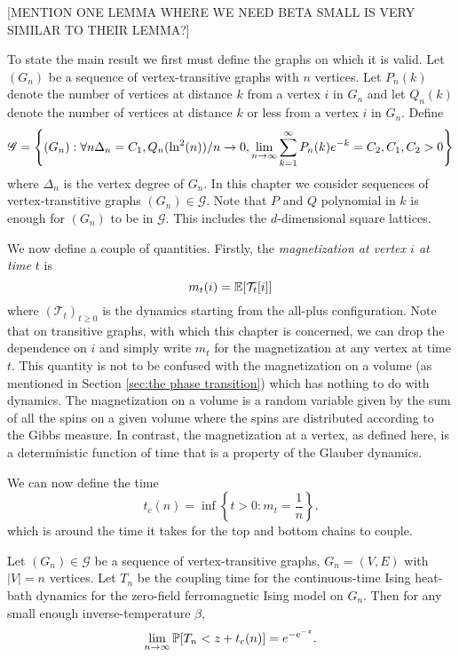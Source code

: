 [MENTION ONE LEMMA WHERE WE NEED BETA SMALL IS VERY SIMILAR TO THEIR LEMMA?]

To state the main result we first must define the graphs on which it is valid. Let $(G_{n})$ be a sequence of vertex-transitive graphs with $n$ vertices. Let $P_n(k)$ denote the number of vertices at distance $k$ from a vertex $i$ in $G_n$ and let $Q_n(k)$ denote the number of vertices at distance $k$ or less from a vertex $i$ in $G_n$. Define
\begin{equation}
	\mathscr{G} = \left\{(G_n) : \forall n \Delta_n = C_1, Q_n(\ln^2(n))/n \rightarrow 0, \lim_{n \rightarrow \infty}\sum_{k = 1}^\infty P_n(k)e^{-k} = C_2, C_1, C_2 > 0\right\}
	\label{eq:set valid graphs}
\end{equation}
where $\Delta_n$ is the vertex degree of $G_n$.
In this chapter we consider sequences of vertex-transtitive graphs $(G_n) \in \mathscr{G}$. Note that $P$ and $Q$ polynomial in $k$ is enough for $(G_n)$ to be in $\mathscr{G}$. This includes the $d$-dimensional square lattices.

We now define a couple of quantities. Firstly, the \emph{magnetization at vertex $i$ at time $t$} is
\begin{equation}
	 	m_t(i) = \mathbb{E}[\mathcal{T}_t[i]]
\end{equation} 
where $(\mathcal{T}_t)_{t \geq 0}$ is the dynamics starting from the all-plus configuration. Note that on transitive graphs, with which this chapter is concerned, we can drop the dependence on $i$ and simply write $m_t$ for the magnetization at any vertex at time $t$. This quantity is not to be confused with the magnetization on a volume (as mentioned in Section \ref{sec:the phase transition}) which has nothing to do with dynamics. The magnetization on a volume is a random variable given by the sum of all the spins on a given volume where the spins are distributed according to the Gibbs measure. In contrast, the magnetization at a vertex, as defined here, is a deterministic function of time that is a property of the Glauber dynamics.

We can now define the time
\begin{equation}
	\label{eq:definition t_c(n)}
	t_c(n) = \inf\left\{ t > 0 : m_t = \frac{1}{n}\right\}.
\end{equation}
which is around the time it takes for the top and bottom chains to couple.

\begin{theorem}
\label{thm:Coupling Distribution on transitive graph}
	Let $(G_n) \in \mathscr{G}$ be a sequence of vertex-transitive graphs, $G_n = (V, E)$ with $|V| = n$ vertices. Let $T_n$ be the coupling time for the continuous-time Ising heat-bath dynamics for the zero-field ferromagnetic Ising model on $G_n$. Then for any small enough inverse-temperature $\beta$,
	\begin{equation}
		\lim_{n \rightarrow \infty} \mathbb{P}[T_n < z + t_c(n)] = e^{-e^{-z}}.
	\end{equation}
\end{theorem}

